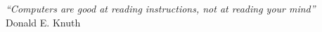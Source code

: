 \cleardoublepage
\thispagestyle{plain}

\vspace*{8cm}

\begin{flushright}
   \textsl{``Computers are good at reading instructions, not at reading your mind''} \\
\vspace*{1.5cm}
           Donald E. Knuth
\end{flushright}

